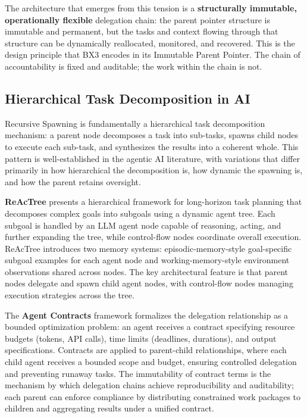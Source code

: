 The architecture that emerges from this tension is a \textbf{structurally immutable, operationally flexible} delegation chain: the parent pointer structure is immutable and permanent, but the tasks and context flowing through that structure can be dynamically reallocated, monitored, and recovered. This is the design principle that BX3 encodes in its Immutable Parent Pointer. The chain of accountability is fixed and auditable; the work within the chain is not.

\subsection{Hierarchical Task Decomposition in AI}

Recursive Spawning is fundamentally a hierarchical task decomposition mechanism: a parent node decomposes a task into sub-tasks, spawns child nodes to execute each sub-task, and synthesizes the results into a coherent whole. This pattern is well-established in the agentic AI literature, with variations that differ primarily in how hierarchical the decomposition is, how dynamic the spawning is, and how the parent retains oversight.

\textbf{ReAcTree} \cite{reactree2025} presents a hierarchical framework for long-horizon task planning that decomposes complex goals into subgoals using a dynamic agent tree. Each subgoal is handled by an LLM agent node capable of reasoning, acting, and further expanding the tree, while control-flow nodes coordinate overall execution. ReAcTree introduces two memory systems: episodic-memory-style goal-specific subgoal examples for each agent node and working-memory-style environment observations shared across nodes. The key architectural feature is that parent nodes delegate and spawn child agent nodes, with control-flow nodes managing execution strategies across the tree.

The \textbf{Agent Contracts} framework \cite{agentcontracts2025} formalizes the delegation relationship as a bounded optimization problem: an agent receives a contract specifying resource budgets (tokens, API calls), time limits (deadlines, durations), and output specifications. Contracts are applied to parent-child relationships, where each child agent receives a bounded scope and budget, ensuring controlled delegation and preventing runaway tasks. The immutability of contract terms is the mechanism by which delegation chains achieve reproducibility and auditability; each parent can enforce compliance by distributing constrained work packages to children and aggregating results under a unified contract.

